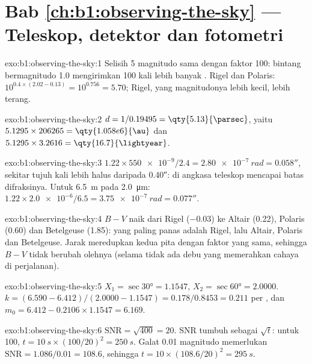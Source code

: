 \section*{Bab \ref{ch:b1:observing-the-sky} --- Teleskop, detektor dan fotometri}

\begin{solution}{exo:b1:observing-the-sky:1}
Selisih 5 magnitudo sama dengan faktor 100: bintang bermagnitudo 1.0 mengirimkan 100 kali lebih banyak . Rigel dan Polaris: $10^{0.4\times(2.02 - 0.13)} =
10^{0.756} = 5.70$; Rigel, yang magnitudonya lebih kecil, lebih terang.
\end{solution}

\begin{solution}{exo:b1:observing-the-sky:2}
$d = 1/0.19495 = \qty{5.13}{\parsec}$, yaitu $5.1295\times206265 =
\qty{1.058e6}{\au}$ dan $5.1295\times3.2616 = \qty{16.7}{\lightyear}$.
\end{solution}

\begin{solution}{exo:b1:observing-the-sky:3}
$1.22\times\num{550e-9}/2.4 = \qty{2.80e-7}{rad} = \ang{;;0.058}$, sekitar
tujuh kali lebih halus daripada  \ang{;;0.40}: di angkasa teleskop
mencapai batas difraksinya. Untuk \qty{6.5}{m} pada \qty{2.0}{\micro\metre}:
$1.22\times\num{2.0e-6}/6.5 = \qty{3.75e-7}{rad} = \ang{;;0.077}$.
\end{solution}

\begin{solution}{exo:b1:observing-the-sky:4}
$B - V$ naik dari Rigel ($-0.03$) ke Altair (0.22), Polaris (0.60) dan Betelgeuse (1.85): yang paling panas adalah Rigel, lalu Altair, Polaris dan Betelgeuse. Jarak meredupkan kedua pita dengan faktor yang sama, sehingga $B - V$ tidak berubah olehnya (selama tidak ada debu yang memerahkan cahaya di perjalanan).
\end{solution}

\begin{solution}{exo:b1:observing-the-sky:5}
$X_1 = \sec\ang{30} = 1.1547$, $X_2 = \sec\ang{60} = 2.0000$.
$k = (6.590 - 6.412)/(2.0000 - 1.1547) = 0.178/0.8453 = \num{0.211}$ per
, dan $m_0 = 6.412 - 0.2106\times1.1547 = 6.169$.
\end{solution}

\begin{solution}{exo:b1:observing-the-sky:6}
$\mathrm{SNR} = \sqrt{400} = 20$. SNR tumbuh sebagai $\sqrt t$: untuk 100,
$t = \qty{10}{s}\times(100/20)^2 = \qty{250}{s}$. Galat \num{0.01}
magnitudo memerlukan $\mathrm{SNR} = 1.086/0.01 = 108.6$, sehingga
$t = 10\times(108.6/20)^2 = \qty{295}{s}$.
\end{solution}


